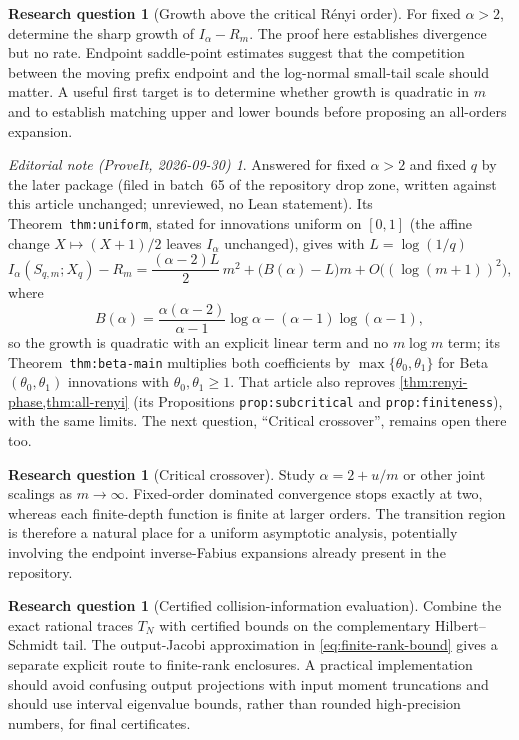 \documentclass[11pt,a4paper]{article}
\numberwithin{equation}{section}
\theoremstyle{definition}\newtheorem{definition}[theorem]{Definition}
\newtheorem{problem}[theorem]{Research question}
\theoremstyle{remark}\newtheorem{remark}[theorem]{Remark}
\newtheorem*{ednotelater}{Editorial note (ProveIt, 2026-09-30)}
\begin{document}
\begin{problem}[Growth above the critical R\'enyi order]
For fixed $\alpha>2$, determine the sharp growth of $I_\alpha-R_m$. The proof here establishes divergence but no rate. Endpoint saddle-point estimates suggest that the competition between the moving prefix endpoint and the log-normal small-tail scale should matter. A useful first target is to determine whether growth is quadratic in $m$ and to establish matching upper and lower bounds before proposing an all-orders expansion.
\end{problem}
\begin{ednotelater}
Answered for fixed $\alpha>2$ and fixed $q$ by the later package
(filed in batch~65 of the repository drop zone, written against this
article unchanged; unreviewed, no Lean statement). Its
Theorem~\texttt{thm:uniform}, stated for innovations uniform on $[0,1]$
(the affine change $X\mapsto(X+1)/2$ leaves $I_\alpha$ unchanged), gives
with $L=\log(1/q)$
\[
 I_\alpha(S_{q,m};X_q)-R_m=\frac{(\alpha-2)L}{2}\,m^2+\bigl(B(\alpha)-L\bigr)m
 +O\bigl((\log(m+1))^2\bigr),
\]
where
\[
 B(\alpha)=\frac{\alpha(\alpha-2)}{\alpha-1}\log\alpha-(\alpha-1)\log(\alpha-1),
\]
so the growth is quadratic with an explicit linear term and no $m\log m$
term; its Theorem~\texttt{thm:beta-main} multiplies both coefficients by
$\max\{\theta_0,\theta_1\}$ for Beta$(\theta_0,\theta_1)$ innovations with
$\theta_0,\theta_1\ge1$. That article also reproves
\cref{thm:renyi-phase,thm:all-renyi} (its Propositions
\texttt{prop:subcritical} and \texttt{prop:finiteness}), with the same
limits. The next question, ``Critical crossover'', remains open there too.
\end{ednotelater}

\begin{problem}[Critical crossover]
Study $\alpha=2+u/m$ or other joint scalings as $m\to\infty$. Fixed-order dominated convergence stops exactly at two, whereas each finite-depth function is finite at larger orders. The transition region is therefore a natural place for a uniform asymptotic analysis, potentially involving the endpoint inverse-Fabius expansions already present in the repository.
\end{problem}

\begin{problem}[Certified collision-information evaluation]
Combine the exact rational traces $T_N$ with certified bounds on the complementary Hilbert--Schmidt tail. The output-Jacobi approximation in \eqref{eq:finite-rank-bound} gives a separate explicit route to finite-rank enclosures. A practical implementation should avoid confusing output projections with input moment truncations and should use interval eigenvalue bounds, rather than rounded high-precision numbers, for final certificates.
\end{problem}
\end{document}
